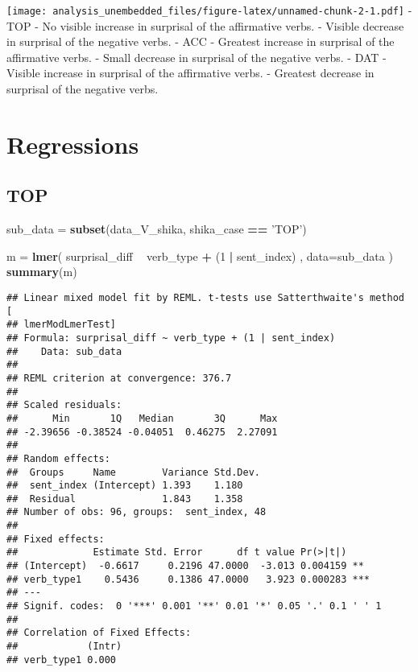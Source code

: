 \documentclass[]{ltjsarticle}
\newenvironment{Shaded}{\begin{snugshade}}{\end{snugshade}}
\newcommand{\KeywordTok}[1]{\textcolor[rgb]{0.13,0.29,0.53}{\textbf{#1}}}
\newcommand{\DataTypeTok}[1]{\textcolor[rgb]{0.13,0.29,0.53}{#1}}
\newcommand{\DecValTok}[1]{\textcolor[rgb]{0.00,0.00,0.81}{#1}}
\newcommand{\StringTok}[1]{\textcolor[rgb]{0.31,0.60,0.02}{#1}}
\newcommand{\OperatorTok}[1]{\textcolor[rgb]{0.81,0.36,0.00}{\textbf{#1}}}
\newcommand{\NormalTok}[1]{#1}
\begin{document}
\texttt{[image: analysis\_unembedded\_files/figure-latex/unnamed-chunk-2-1.pdf]}
- TOP - No visible increase in surprisal of the affirmative verbs. -
Visible decrease in surprisal of the negative verbs. - ACC - Greatest
increase in surprisal of the affirmative verbs. - Small decrease in
surprisal of the negative verbs. - DAT - Visible increase in surprisal
of the affirmative verbs. - Greatest decrease in surprisal of the
negative verbs.

\section{Regressions}\label{regressions}

\subsection{TOP}\label{top}

\begin{Shaded}
\begin{Highlighting}[]
\NormalTok{sub_data =}\StringTok{ }\KeywordTok{subset}\NormalTok{(data_V_shika, shika_case }\OperatorTok{==}\StringTok{ 'TOP'}\NormalTok{)}

\NormalTok{m =}\StringTok{ }\KeywordTok{lmer}\NormalTok{(}
\NormalTok{        surprisal_diff}
            \OperatorTok{~}\StringTok{ }\NormalTok{verb_type}
                \OperatorTok{+}\StringTok{ }\NormalTok{(}\DecValTok{1} \OperatorTok{|}\StringTok{ }\NormalTok{sent_index)}
\NormalTok{        ,}
        \DataTypeTok{data=}\NormalTok{sub_data}
\NormalTok{        )}
\KeywordTok{summary}\NormalTok{(m)}
\end{Highlighting}
\end{Shaded}

\begin{verbatim}
## Linear mixed model fit by REML. t-tests use Satterthwaite's method [
## lmerModLmerTest]
## Formula: surprisal_diff ~ verb_type + (1 | sent_index)
##    Data: sub_data
## 
## REML criterion at convergence: 376.7
## 
## Scaled residuals: 
##      Min       1Q   Median       3Q      Max 
## -2.39656 -0.38524 -0.04051  0.46275  2.27091 
## 
## Random effects:
##  Groups     Name        Variance Std.Dev.
##  sent_index (Intercept) 1.393    1.180   
##  Residual               1.843    1.358   
## Number of obs: 96, groups:  sent_index, 48
## 
## Fixed effects:
##             Estimate Std. Error      df t value Pr(>|t|)    
## (Intercept)  -0.6617     0.2196 47.0000  -3.013 0.004159 ** 
## verb_type1    0.5436     0.1386 47.0000   3.923 0.000283 ***
## ---
## Signif. codes:  0 '***' 0.001 '**' 0.01 '*' 0.05 '.' 0.1 ' ' 1
## 
## Correlation of Fixed Effects:
##            (Intr)
## verb_type1 0.000
\end{verbatim}
\end{document}
